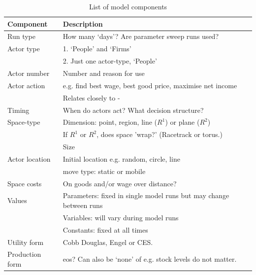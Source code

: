 \renewcommand{\arraystretch}{1.2}
\begin{table}[!hbt]
\begin{center}

\begin{tabular}{|l|l|}
\hline 
\textbf{Component} & \textbf{Description}\\
\hline
Run type & How many `days'? Are parameter sweep runs used?\\
\hline
Actor type & 1. `People' and `Firms'\\
& 2. Just one actor-type, `People'\\
\hline
Actor number & Number and reason for use\\
\hline
Actor action & e.g. find best wage, best good price, maximise net income\\
& Relates closely to -\\
\hline
Timing &
When do actors act? What decision structure?\\
\hline
Space-type &
Dimension: point, region, line ($R^1$) or plane ($R^2$)\\
& If $R^1$ or $R^2$, does space 'wrap?' (Racetrack or torus.)\\
& Size\\
\hline
Actor location & Initial location e.g. random, circle, line\\
&move type: static or mobile\\
\hline
Space costs & On goods and/or wage over distance?\\
\hline
Values & Parameters: fixed in single model runs but may change between runs\\
& Variables: will vary during model runs\\
& Constants: fixed at all times\\
\hline
Utility form & Cobb Douglas, Engel or CES.\\
\hline
Production form & \gls{eos}? Can also be `none' of e.g. stock levels do not matter.\\
\hline


\end{tabular}

\caption{List of model components \label{tab:components}}
\end{center}
\end{table}